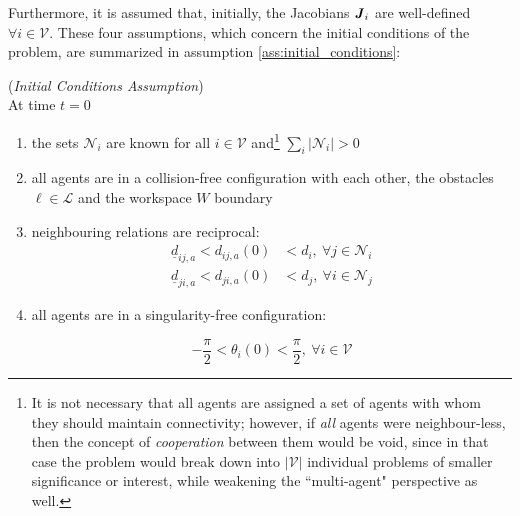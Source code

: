 Furthermore, it is assumed that, initially, the Jacobians $\bm{\mathit{J}}_i$ are
well-defined $\forall i \in \mathcal{V}$. These four assumptions, which concern
the initial conditions of the problem, are summarized in assumption
\ref{ass:initial_conditions}:

\begin{gg_box}
\begin{assumption}(\textit{Initial Conditions Assumption})\\

  At time $t = 0$

  \begin{enumerate}

    \item the sets $\mathcal{N}_i$ are known for all $i \in \mathcal{V}$
      and\footnote{It is not necessary that
      all agents are assigned a set of agents with whom they should maintain
      connectivity; however, if \textit{all} agents were neighbour-less,
      then the concept of \textit{cooperation} between them would be void,
      since in that case the problem would break down into $|\mathcal{V}|$
      individual problems of smaller significance or interest, while
      weakening the ``multi-agent" perspective as well.}
      $\sum\limits_i |\mathcal{N}_i| > 0$

    \item all agents are in a collision-free configuration with each other,
      the obstacles $\ell \in \mathcal{L}$ and the workspace $W$ boundary

    \item neighbouring relations are reciprocal:
      \begin{subequations}
      \begin{align}
        \underline{d}_{ij,a} < d_{ij,a}(0) &< d_i,\ \forall j \in \mathcal{N}_i \\
        \underline{d}_{ji,a} < d_{ji,a}(0) &< d_j,\ \forall i \in \mathcal{N}_j
      \end{align}
      \end{subequations}

    \item all agents are in a singularity-free configuration:

      $$ -\frac{\pi}{2} < \theta_i(0) < \frac{\pi}{2},\ \forall i \in \mathcal{V}$$

  \end{enumerate}
  \label{ass:initial_conditions}
\end{assumption}
\end{gg_box}
